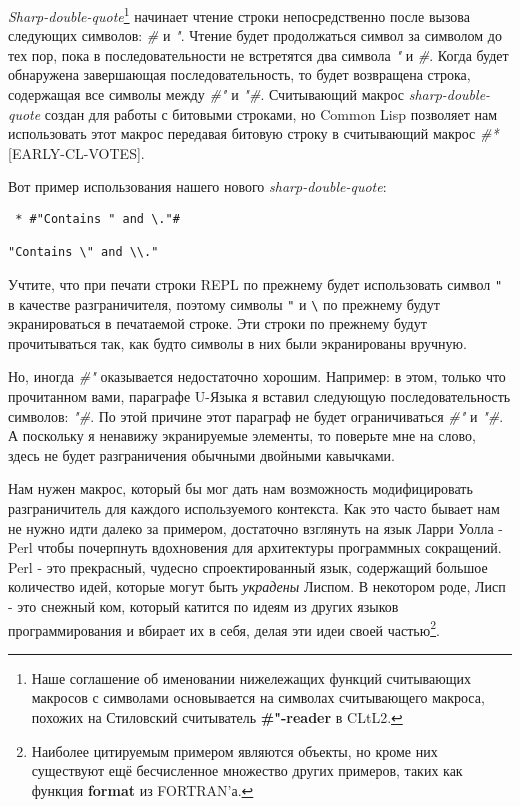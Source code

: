 \emph{Sharp-double-quote}\footnote{Наше соглашение об именовании нижележащих функций считывающих макросов с символами основывается на символах считывающего макроса, похожих на Стиловский считыватель \textbf{\#"-reader} в CLtL2.} начинает чтение строки непосредственно после вызова следующих символов: \emph{\#} и \emph{"}. Чтение будет продолжаться символ за символом до тех пор, пока в последовательности не встретятся два символа \emph{"} и \emph{\#}. Когда будет обнаружена завершающая последовательность, то будет возвращена строка, содержащая все символы между \emph{\#"} и \emph{"\#}. Считывающий макрос \emph{sharp-double-quote} создан для работы с битовыми строками, но Common Lisp позволяет нам использовать этот макрос передавая битовую строку в считывающий макрос \emph{\#*} [EARLY-CL-VOTES]. 

Вот пример использования нашего нового \emph{sharp-double-quote}:

\begin{verbatim}
 * #"Contains " and \."#

"Contains \" and \\."
\end{verbatim}

Учтите, что при печати строки REPL по прежнему будет использовать символ \verb|"| в качестве разграничителя, поэтому символы \verb|"| и \verb"\" по прежнему будут экранироваться в печатаемой строке. Эти строки по прежнему будут прочитываться так, как будто символы в них были экранированы вручную.

Но, иногда \emph{\#"} оказывается недостаточно хорошим. Например: в этом, только что прочитанном вами, параграфе U-Языка я вставил следующую последовательность символов: \emph{"\#}. По этой причине этот параграф не будет ограничиваться \emph{\#"} и \emph{"\#}. А поскольку я ненавижу экранируемые элементы, то поверьте мне на слово, здесь не будет разграничения обычными двойными кавычками.

Нам нужен макрос, который бы мог дать нам возможность модифицировать разграничитель для каждого используемого контекста. Как это часто бывает нам не нужно идти далеко за примером, достаточно взглянуть на язык Ларри Уолла - Perl чтобы почерпнуть вдохновения для архитектуры программных сокращений. Perl - это прекрасный, чудесно спроектированный язык, содержащий большое количество идей, которые могут быть \emph{украдены} Лиспом. В некотором роде, Лисп - это снежный ком, который катится по идеям из других языков программирования и вбирает их в себя, делая эти идеи своей частью\footnote{Наиболее цитируемым примером являются объекты, но кроме них существуют ещё бесчисленное множество других примеров, таких как функция \textbf{format} из FORTRAN'а.}.

